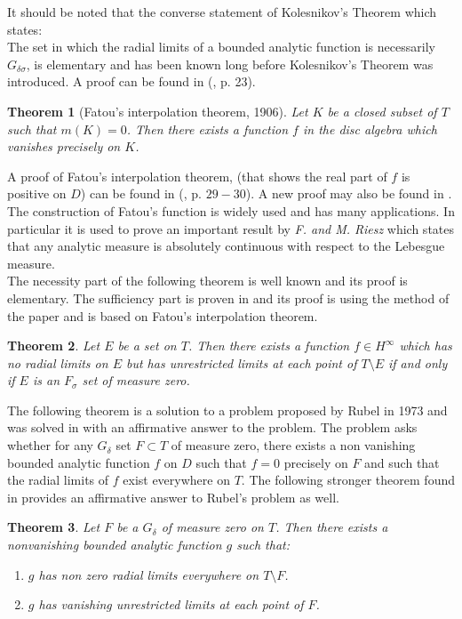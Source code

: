 \documentclass[12pt]{article}
\newtheorem{theorem}{Theorem}
\begin{document}
\noindent It should be noted that the converse statement of {Kolesnikov's Theorem} which states:\\
\noindent The set in which the radial limits of a bounded analytic function is necessarily $G_{\delta\sigma}$, is elementary and has been known long before {Kolesnikov's Theorem} was introduced. A proof can be found in (\cite{AL}, p. 23).

\begin{theorem}[Fatou's interpolation theorem, 1906] Let $K$ be a closed subset of $T$ such that $m(K)=0$. Then there exists a function $f$ in the disc algebra which vanishes precisely on $K$.
\end{theorem}

\noindent A proof of {Fatou's interpolation theorem}, (that shows the real part of $f$ is positive on $D$) can be found in (\cite{KO}, p. $29-30$). A new proof may also be found in \cite{ART}. The construction of Fatou's function is widely used and has many applications. In particular it is used to prove an important result by \emph{F. and M. Riesz} which states that any analytic measure is absolutely continuous with respect to the Lebesgue measure.\\
\noindent The necessity part of the following theorem is well known and its proof is elementary. The sufficiency part is proven in \cite{Da} and its proof is using the method of the paper \cite{AD} and is based on {Fatou's interpolation theorem}.

\begin{theorem}
Let $E$ be a set on $T$. Then there exists a function $f\in H^\infty$ which has no radial limits on $E$ but has unrestricted limits at each point of $T\setminus E$ if and only if $E$ is an $F_\sigma$ set of measure zero.
\end{theorem}

\noindent The following theorem is a solution to a problem proposed by Rubel in 1973 and was solved in \cite{DA} with an affirmative answer to the problem. The problem asks whether for any $G_\delta$ set $F\subset T$ of measure zero, there exists a non vanishing bounded analytic function $f$ on $D$ such that $f=0$ precisely on $F$ and such that the radial limits of $f$ exist everywhere on $T$. The following stronger theorem found in \cite{art} provides an affirmative answer to Rubel's problem as well.

\begin{theorem} Let $F$ be a $G_\delta$ of measure zero on $T$. Then there exists a nonvanishing bounded analytic function $g$ such that:\begin{enumerate}
 \item $g$ has non zero radial limits everywhere on $T\setminus F$.
 \item $g$ has vanishing unrestricted limits at each point of $F$.
 \end{enumerate}
\end{theorem}
\end{document}
